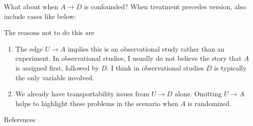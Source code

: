 \documentclass{beamer}
\begin{document}
\begin{frame}{What about when $A\rightarrow D$ is confounded?}
When treatment precedes version, \citet{hernan2011} also include cases like below:
\begin{center}
\end{center}
The reasons not to do this are
\begin{enumerate}
\item The edge $U\rightarrow A$ implies this is an observational study rather than an experiment. In observational studies, I usually do not believe the story that $A$ is assigned first, followed by $D$. I think in observational studies $D$ is typically the only variable involved.
\item We already have transportability issues from $U\rightarrow D$ alone. Omitting $U\rightarrow A$ helps to highlight these problems in the scenario when $A$ is randomized.
\end{enumerate}
\end{frame}

\begin{frame}{References}

\end{frame}
\end{document}
